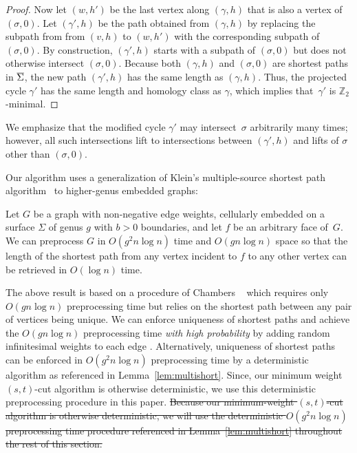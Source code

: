 \documentclass[letterpaper,review]{siamart190516}
\def\Z{\mathbb{Z}}
\def\cycle{\gamma}
\def\Sigmabar{\overline{\smash{\Sigma}\vphantom{t}}}
\def\modified#1{\color{blue}#1 \color{black}}
\begin{document}
{\begin{proof}
Now let $(w,h')$ be the last vertex along $(\cycle,h)$ that is also a vertex of $(\sigma,0)$.  Let $(\cycle', h)$ be the path obtained from $(\cycle, h)$ by replacing the subpath from from $(v,h)$ to $(w,h')$ with the corresponding subpath of $(\sigma,0)$.  By construction, $(\cycle', h)$ starts with a subpath of $(\sigma,0)$ but does not otherwise intersect $(\sigma,0)$.   Because both $(\cycle, h)$ and $(\sigma,0)$ are shortest paths in $\Sigmabar$, the new path $(\cycle', h)$ has the same length as $(\cycle, h)$.  Thus, the projected cycle $\cycle'$ has the same length and homology class as $\cycle$, which implies that~$\cycle'$ is $\Z_2$-minimal.
\end{proof}

We emphasize that the modified cycle $\cycle'$ may intersect~$\sigma$ arbitrarily many times; however, all such intersections lift to intersections between $(\cycle', h)$ and lifts of $\sigma$ other than $(\sigma, 0)$.

Our algorithm uses a generalization of Klein's  multiple-source shortest path algorithm~\cite{k-msspp-05} to higher-genus embedded graphs:

\begin{lemma}
\label{lem:multishort}
Let $G$ be a graph with non-negative edge weights, cellularly embedded on a surface $\Sigma$ of
genus $g$ with $b>0$ boundaries, and let $f$ be an arbitrary face of~$G$.
We can preprocess $G$ in $O(g^2n\log n)$ time and $O(g n \log n)$ space so that the length of the
shortest path from any vertex incident to $f$ to any other vertex can be retrieved in $O(\log n)$
time.
\end{lemma}

The above result is based on a procedure of Chambers \etal~\cite{cce-msspe-13} which requires only
$O(g n \log n)$ preprocessing time but relies on the shortest path between any pair of vertices
being unique.
We can enforce uniqueness of shortest paths and achieve the $O(g n \log n)$ preprocessing time
\emph{with high probability} by adding random infinitesimal weights to each edge \cite{mvv-memi-87}.
\modified{Alternatively, uniqueness of shortest paths can be enforced in $O(g^2 n \log n)$ preprocessing time by a deterministic algorithm as referenced in
Lemma~\ref{lem:multishort}. Since, our minimum weight $(s,t)$-cut algorithm is otherwise deterministic, we use this deterministic preprocessing procedure in this paper.}
\sout{Because our minimum-weight $(s,t)$-cut algorithm is otherwise deterministic, we will use the
deterministic $O(g^2 n \log n)$ preprocessing time procedure referenced in
Lemma~\ref{lem:multishort} throughout the rest of this section.}

}
\end{document}
